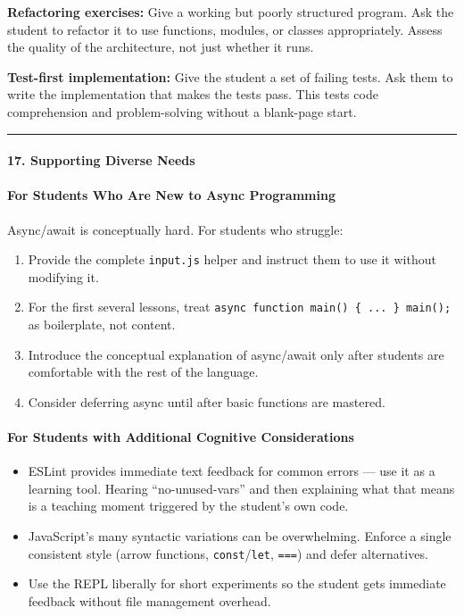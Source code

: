 \documentclass[
  justified,
  openright,
]{tufte-book}
\let\subsection\paragraph
\let\paragraph\paragraph
\let\subsection\paragraph
\let\paragraph\paragraph
\providecommand{\tightlist}{%
  \setlength{\itemsep}{0pt}\setlength{\parskip}{0pt}}
\begin{document}
\textbf{Refactoring exercises:} Give a working but poorly structured
program. Ask the student to refactor it to use functions, modules, or
classes appropriately. Assess the quality of the architecture, not just
whether it runs.

\textbf{Test-first implementation:} Give the student a set of failing
tests. Ask them to write the implementation that makes the tests pass.
This tests code comprehension and problem-solving without a blank-page
start.

\begin{center}\rule{0.5\linewidth}{0.5pt}\end{center}

\subsection{17. Supporting Diverse
Needs}\label{supporting-diverse-needs}

\subsection{For Students Who Are New to Async
Programming}\label{for-students-who-are-new-to-async-programming}

Async/await is conceptually hard. For students who struggle:

\begin{enumerate}
\def\labelenumi{\arabic{enumi}.}
\tightlist
\item
  Provide the complete \texttt{input.js} helper and instruct them to use
  it without modifying it.
\item
  For the first several lessons, treat
  \texttt{async\ function\ main()\ \{\ ...\ \}\ main();} as boilerplate,
  not content.
\item
  Introduce the conceptual explanation of async/await only after
  students are comfortable with the rest of the language.
\item
  Consider deferring async until after basic functions are mastered.
\end{enumerate}

\subsection{For Students with Additional Cognitive
Considerations}\label{for-students-with-additional-cognitive-considerations}

\begin{itemize}
\tightlist
\item
  ESLint provides immediate text feedback for common errors --- use it
  as a learning tool. Hearing ``no-unused-vars'' and then explaining
  what that means is a teaching moment triggered by the student's own
  code.
\item
  JavaScript's many syntactic variations can be overwhelming. Enforce a
  single consistent style (arrow functions, \texttt{const}/\texttt{let},
  \texttt{===}) and defer alternatives.
\item
  Use the REPL liberally for short experiments so the student gets
  immediate feedback without file management overhead.
\end{itemize}
\end{document}
